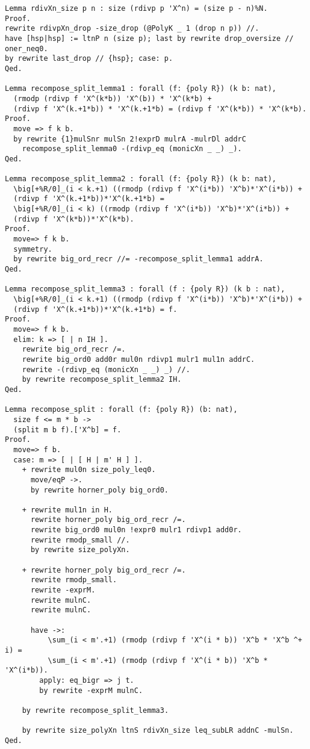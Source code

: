 \begin{lstlisting}
Lemma rdivXn_size p n : size (rdivp p 'X^n) = (size p - n)%N.
Proof.
rewrite rdivpXn_drop -size_drop (@PolyK _ 1 (drop n p)) //.
have [hsp|hsp] := ltnP n (size p); last by rewrite drop_oversize // oner_neq0.
by rewrite last_drop // {hsp}; case: p.
Qed.

Lemma recompose_split_lemma1 : forall (f: {poly R}) (k b: nat),
  (rmodp (rdivp f 'X^(k*b)) 'X^(b)) * 'X^(k*b) +
  (rdivp f 'X^(k.+1*b)) * 'X^(k.+1*b) = (rdivp f 'X^(k*b)) * 'X^(k*b).
Proof.
  move => f k b.
  by rewrite {1}mulSnr mulSn 2!exprD mulrA -mulrDl addrC
    recompose_split_lemma0 -(rdivp_eq (monicXn _ _) _).
Qed.

Lemma recompose_split_lemma2 : forall (f: {poly R}) (k b: nat),
  \big[+%R/0]_(i < k.+1) ((rmodp (rdivp f 'X^(i*b)) 'X^b)*'X^(i*b)) +
  (rdivp f 'X^(k.+1*b))*'X^(k.+1*b) =
  \big[+%R/0]_(i < k) ((rmodp (rdivp f 'X^(i*b)) 'X^b)*'X^(i*b)) +
  (rdivp f 'X^(k*b))*'X^(k*b).
Proof.
  move=> f k b.
  symmetry.
  by rewrite big_ord_recr //= -recompose_split_lemma1 addrA.
Qed.

Lemma recompose_split_lemma3 : forall (f : {poly R}) (k b : nat),
  \big[+%R/0]_(i < k.+1) ((rmodp (rdivp f 'X^(i*b)) 'X^b)*'X^(i*b)) +
  (rdivp f 'X^(k.+1*b))*'X^(k.+1*b) = f.
Proof.
  move=> f k b.
  elim: k => [ | n IH ].
    rewrite big_ord_recr /=.
    rewrite big_ord0 add0r mul0n rdivp1 mulr1 mul1n addrC.
    rewrite -(rdivp_eq (monicXn _ _) _) //.
    by rewrite recompose_split_lemma2 IH.
Qed.

Lemma recompose_split : forall (f: {poly R}) (b: nat),
  size f <= m * b ->
  (split m b f).['X^b] = f.
Proof.
  move=> f b.
  case: m => [ | [ H | m' H ] ].
    + rewrite mul0n size_poly_leq0.
      move/eqP ->.
      by rewrite horner_poly big_ord0.

    + rewrite mul1n in H.
      rewrite horner_poly big_ord_recr /=.
      rewrite big_ord0 mul0n !expr0 mulr1 rdivp1 add0r.
      rewrite rmodp_small //.
      by rewrite size_polyXn.

    + rewrite horner_poly big_ord_recr /=.
      rewrite rmodp_small.
      rewrite -exprM.
      rewrite mulnC.
      rewrite mulnC.

      have ->:
          \sum_(i < m'.+1) (rmodp (rdivp f 'X^(i * b)) 'X^b * 'X^b ^+ i) =
          \sum_(i < m'.+1) (rmodp (rdivp f 'X^(i * b)) 'X^b * 'X^(i*b)).
        apply: eq_bigr => j t.
        by rewrite -exprM mulnC.

    by rewrite recompose_split_lemma3.

    by rewrite size_polyXn ltnS rdivXn_size leq_subLR addnC -mulSn.
Qed.


\end{lstlisting}
